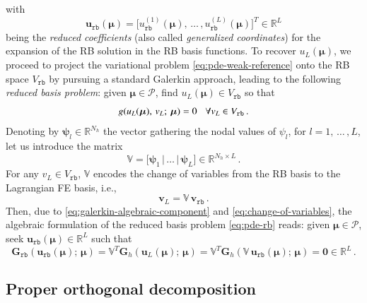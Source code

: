 \documentclass[longtitle]{elsarticle}
\numberwithin{equation}{section}
\theoremstyle{theorem}
\theoremstyle{definition}
\theoremstyle{remark}
\theoremstyle{proposition}
\numberwithin{figure}{section}
\newcommand{\bg}[1]{\boldsymbol{#1}}
\begin{document}
		with \[ \mathbf{u}_{\texttt{rb}}(\bg{\mu}) = \big[ u_{\texttt{rb}}^{(1)}(\bg{\mu}), \, \ldots \, , u_{\texttt{rb}}^{(L)}(\bg{\mu}) \big]^T \in \mathbb{R}^L \] being the \emph{reduced coefficients} (also called \emph{generalized coordinates}) for the expansion of the RB solution in the RB basis functions. To recover $u_L(\bg{\mu})$, we proceed to project the variational problem \eqref{eq:pde-weak-reference} onto the RB space $V_{\texttt{rb}}$ by pursuing a standard Galerkin approach, leading to the following \emph{reduced basis problem}: given $\bg{\mu} \in \mathcal{P}$, find $u_L(\bg{\mu}) \in V_{\texttt{rb}}$ so that
		\begin{equation}
			\label{eq:pde-rb}
			g(u_L(\bg{\mu}), \, v_L; \, \bg{\mu}) = 0 \hspace*{0.3cm} \forall v_L \in V_{\texttt{rb}} \, .
		\end{equation}
		Denoting by $\bg{\psi}_l \in \mathbb{R}^{N_h}$ the vector gathering the nodal values of $\psi_l$, for $l = 1, \, \ldots \, , L$, let us introduce the matrix
		\begin{equation*}
			\mathbb{V} = \big[ \bg{\psi}_1 \, \vert \, \ldots \, \vert \, \bg{\psi}_L \big] \in \mathbb{R}^{N_h \times L} \, .
		\end{equation*}
		For any $v_L \in V_{\texttt{rb}}$, $\mathbb{V}$ encodes the change of variables from the RB basis to the Lagrangian FE basis, i.e.,
		\begin{equation}
			\label{eq:change-of-variables}
			\mathbf{v}_L = \mathbb{V} \, \mathbf{v}_{\texttt{rb}} \, .
		\end{equation}
		Then, due to \eqref{eq:galerkin-algebraic-component} and \eqref{eq:change-of-variables}, the algebraic formulation of the reduced basis problem \eqref{eq:pde-rb} reads: given $\bg{\mu} \in \mathcal{P}$, seek $\mathbf{u}_{\texttt{rb}}(\bg{\mu}) \in \mathbb{R}^L$ such that
		\begin{equation}
			\label{eq:pde-rb-algebraic}
			\mathbf{G}_{\texttt{rb}}(\mathbf{u}_{\texttt{rb}}(\bg{\mu}); \, \bg{\mu}) = \mathbb{V}^T \mathbf{G}_h(\mathbf{u}_L(\bg{\mu}); \, \bg{\mu}) = \mathbb{V}^T \mathbf{G}_h(\mathbb{V} \, \mathbf{u}_{\texttt{rb}}(\bg{\mu}); \, \bg{\mu}) = \bg{0} \in \mathbb{R}^L \, . 
		\end{equation}

		
	\subsection{Proper orthogonal decomposition}
	\label{section:Proper Orthogonal Decomposition} 
		
\end{document}
